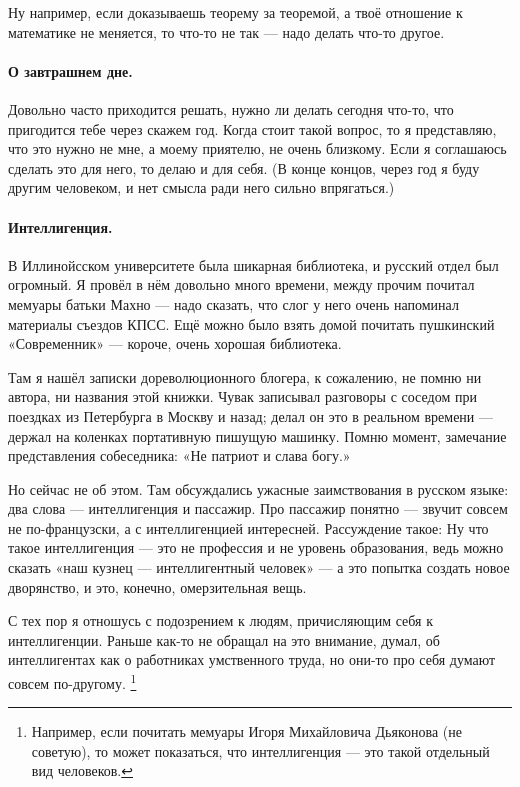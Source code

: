 \documentclass{book}
\begin{document}
Ну например, если доказываешь теорему за теоремой, а твоё отношение к математике не меняется, то что-то не так --- надо делать что-то другое.

\paragraph{О завтрашнем дне.}
Довольно часто приходится решать, нужно ли делать сегодня что-то, что пригодится тебе через скажем год.
Когда стоит такой вопрос, то я представляю, что это нужно не мне, а  моему приятелю, не очень близкому.
Если я соглашаюсь сделать это для него, то делаю и для себя.
(В конце концов, через год я буду другим человеком, и нет смысла ради него сильно впрягаться.)

\paragraph{Интеллигенция.}
В Иллинойсском университете была шикарная библиотека, и русский отдел был огромный.
Я провёл в нём довольно много времени, между прочим почитал мемуары батьки Махно --- надо сказать, что слог у него очень напоминал материалы съездов КПСС.
Ещё можно было взять домой почитать пушкинский «Современник» --- короче, очень хорошая библиотека.

Там я нашёл записки дореволюционного блогера, к сожалению, не помню ни автора, ни названия этой книжки.
Чувак записывал разговоры с соседом при поездках из Петербурга в Москву и назад;
делал он это в реальном времени --- держал на коленках портативную пишущую машинку.
Помню момент, замечание представления собеседника: «Не патриот и слава богу.»

Но сейчас не об этом.
Там обсуждались ужасные заимствования в русском языке: два слова --- интеллигенция и пассажир.
Про пассажир понятно --- звучит совсем не по-французски, а с интеллигенцией интересней.
Рассуждение такое: Ну что такое интеллигенция --- это не профессия и не уровень образования, ведь можно сказать «наш кузнец --- интеллигентный человек» --- а это попытка создать новое дворянство, и это, конечно, омерзительная вещь.

С тех пор я отношусь с подозрением к людям, причисляющим себя к интеллигенции.
Раньше как-то не обращал на это внимание, думал, об интеллигентах как о работниках умственного труда, но они-то про себя думают совсем по-другому.%
\footnote{Например, если почитать мемуары Игоря Михайловича Дьяконова (не советую), то может показаться, что интеллигенция --- это такой отдельный вид человеков.}
\end{document}
